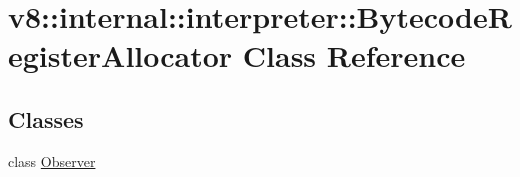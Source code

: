 \hypertarget{classv8_1_1internal_1_1interpreter_1_1BytecodeRegisterAllocator}{}\section{v8\+:\+:internal\+:\+:interpreter\+:\+:Bytecode\+Register\+Allocator Class Reference}
\label{classv8_1_1internal_1_1interpreter_1_1BytecodeRegisterAllocator}
\subsection*{Classes}
\begin{DoxyCompactItemize}
\item 
class \mbox{\hyperlink{classv8_1_1internal_1_1interpreter_1_1BytecodeRegisterAllocator_1_1Observer}{Observer}}
\end{DoxyCompactItemize}
